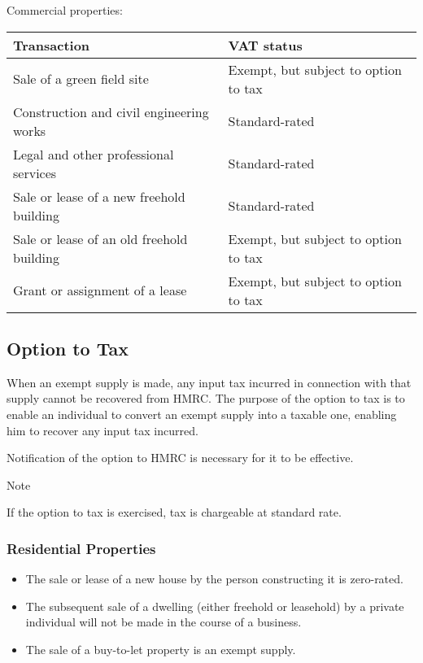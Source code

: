 \documentclass[
]{article}
\providecommand{\tightlist}{%
  \setlength{\itemsep}{0pt}\setlength{\parskip}{0pt}}
\newenvironment{env-881a4bd6-779e-4404-ae5b-86f77846f864}
{
    \savenotes\tcolorbox[blanker,breakable,left=5pt,borderline west={2pt}{-4pt}{blue}]
}
{
    \endtcolorbox\spewnotes
}
\begin{document}
Commercial properties:

\begin{longtable}[]{@{}ll@{}}
\toprule()
Transaction & VAT status \\
\midrule()
\endhead
Sale of a green field site & Exempt, but subject to option to tax \\
Construction and civil engineering works & Standard-rated \\
Legal and other professional services & Standard-rated \\
Sale or lease of a new freehold building & Standard-rated \\
Sale or lease of an old freehold building & Exempt, but subject to
option to tax \\
Grant or assignment of a lease & Exempt, but subject to option to tax \\
\bottomrule()
\end{longtable}

\hypertarget{option-to-tax}{%
\subsection{Option to Tax}\label{option-to-tax}}

When an exempt supply is made, any input tax incurred in connection with
that supply cannot be recovered from HMRC. The purpose of the option to
tax is to enable an individual to convert an exempt supply into a
taxable one, enabling him to recover any input tax incurred.

Notification of the option to HMRC is necessary for it to be effective.

\begin{env-881a4bd6-779e-4404-ae5b-86f77846f864}

Note

If the option to tax is exercised, tax is chargeable at standard rate.

\end{env-881a4bd6-779e-4404-ae5b-86f77846f864}

\hypertarget{residential-properties}{%
\subsubsection{Residential Properties}\label{residential-properties}}

\begin{itemize}
\tightlist
\item
  The sale or lease of a new house by the person constructing it is
  zero-rated.
\item
  The subsequent sale of a dwelling (either freehold or leasehold) by a
  private individual will not be made in the course of a business.
\item
  The sale of a buy-to-let property is an exempt supply.
\end{itemize}
\end{document}
